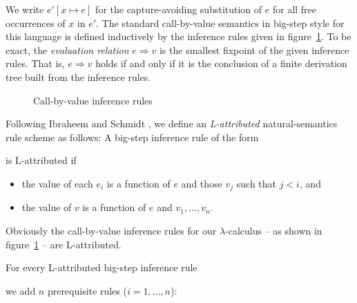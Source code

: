 \documentclass[12pt,a2paper,draft]{article}
\newcommand{\abstr}[2]{\ensuremath{\lambda{#1}.\,{#2}}}
\newcommand{\app}[2]{\ensuremath{{#1}\,{#2}}}
\newcommand{\rec}[2]{\ensuremath{{\normalfont\textsf{rec}}\,{#1}.\,{#2}}}
\begin{document}
We write $e'[x \mapsto e]$ for the capture-avoiding substitution of $e$ for all free occurrences
of $x$ in $e'$. The standard call-by-value semantics in big-step style for this language is
defined inductively by the inference rules given in figure~\ref{fig:Call_by_value_inference_rules}.
To be exact, the \emph{evaluation relation} $e \Rightarrow v$ is the smallest fixpoint of
the given inference rules. That is, $e \Rightarrow v$ holds if and only if it is the conclusion
of a finite derivation tree built from the inference rules.

\begin{figure}[htb]
  \centering
  \caption{Call-by-value inference rules}
  \label{fig:Call_by_value_inference_rules}
\end{figure}

Following Ibraheem and Schmidt \cite{IbraheemSchmidt98}, we define an
\emph{L-attributed} natural-semantics rule scheme as follows: A big-step
inference rule of the form
\begin{mathpar}
\end{mathpar}
is L-attributed if
\begin{itemize}
\item the value of each $e_i$ is a function of $e$ and those $v_j$ such that $j < i$, and
\item the value of $v$ is a function of $e$ and $v_1,\ldots,v_n$.
\end{itemize}
Obviously the call-by-value inference rules for our $\lambda$-calculus -- as shown in
figure~\ref{fig:Call_by_value_inference_rules} -- are L-attributed.

For every L-attributed big-step inference rule
\begin{mathpar}
\end{mathpar}
we add $n$ prerequisite rules ($i = 1,\ldots,n$):
\begin{mathpar}
\end{mathpar}
\end{document}
